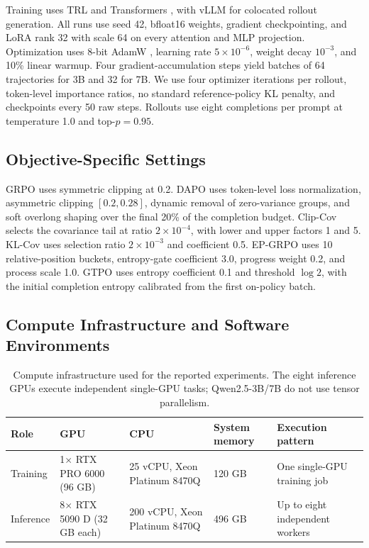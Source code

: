 \documentclass[letterpaper]{article}
\begin{document}
Training uses TRL \citep{vonwerra2020trl} and Transformers
\citep{wolf2020transformers}, with vLLM \citep{kwon2023vllm} for colocated
rollout generation.  All runs use seed 42, bfloat16 weights, gradient
checkpointing, and LoRA \citep{hu2022lora} rank 32 with scale 64 on every
attention and MLP projection.  Optimization uses 8-bit AdamW
\citep{loshchilov2019adamw,dettmers2022eightbit}, learning rate
\(5\times10^{-6}\), weight decay \(10^{-3}\), and 10\% linear warmup.  Four
gradient-accumulation steps yield batches of 64 trajectories for 3B and 32 for
7B.  We use four optimizer iterations per rollout, token-level importance
ratios, no standard reference-policy KL penalty, and checkpoints every 50 raw
steps.  Rollouts use eight completions per prompt at temperature 1.0 and
top-\(p=0.95\).

\subsection{Objective-Specific Settings}

GRPO uses symmetric clipping at 0.2.  DAPO uses token-level loss
normalization, asymmetric clipping \([0.2,0.28]\), dynamic removal of
zero-variance groups, and soft overlong shaping over the final 20\% of the
completion budget.  Clip-Cov selects the covariance tail at ratio
\(2\times10^{-4}\), with lower and upper factors 1 and 5.  KL-Cov uses
selection ratio \(2\times10^{-3}\) and coefficient 0.5.  EP-GRPO uses 10
relative-position buckets, entropy-gate coefficient 3.0, progress weight 0.2,
and process scale 1.0.  GTPO uses entropy coefficient 0.1 and threshold
\(\log2\), with the initial completion entropy calibrated from the first
on-policy batch.

\subsection{Compute Infrastructure and Software Environments}

\begin{table}[t]
\centering
\scriptsize
\setlength{\tabcolsep}{3pt}
\begin{tabular}{@{}p{}p{}p{}p{}p{}@{}}
\toprule
Role & GPU & CPU & System memory & Execution pattern\\
\midrule
Training &
1\(\times\) RTX PRO 6000 (96 GB) &
25 vCPU, Xeon Platinum 8470Q &
120 GB &
One single-GPU training job\\
Inference &
8\(\times\) RTX 5090 D (32 GB each) &
200 vCPU, Xeon Platinum 8470Q &
496 GB &
Up to eight independent workers\\
\bottomrule
\end{tabular}
\caption{Compute infrastructure used for the reported experiments.  The
eight inference GPUs execute independent single-GPU tasks; Qwen2.5-3B/7B do
not use tensor parallelism.}
\label{tab:sup-compute}
\end{table}
\end{document}
